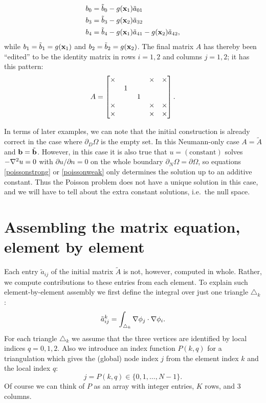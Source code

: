 \begin{example}
\begin{align*}
b_0 &= \tilde b_0 - g(\mathbf{x}_1) \tilde a_{01} \\
b_3 &= \tilde b_3 - g(\mathbf{x}_2) \tilde a_{32} \\
b_4 &= \tilde b_4 - g(\mathbf{x}_1) \tilde a_{41} - g(\mathbf{x}_2) \tilde a_{42},
\end{align*}
while $b_1=\tilde b_1=g(\mathbf{x}_1)$ and $b_2 = \tilde b_2 = g(\mathbf{x}_2)$.  The final matrix $A$ has thereby been ``edited'' to be the identity matrix in rows $i=1,2$ and columns $j=1,2$; it has this pattern:
\begin{equation*}
A = \begin{bmatrix}
\times & & & \times & \times \\
 & \,1\, & & & \\
 & & \,1\, & & \\
\times & & & \times & \times \\
\times & & & \times & \times
\end{bmatrix}.
\end{equation*}
\end{example}
\noindent\hrulefill

\bigskip

In terms of later examples, we can note that the initial construction is already correct in the case where $\partial_D \Omega$ is the empty set.  In this Neumann-only case $A=\tilde A$ and $\mathbf{b} = \tilde {\mathbf{b}}$.  However, in this case it is also true that $u=(\text{constant})$ solves $-\nabla^2 u=0$ with $\partial u/\partial n = 0$ on the whole boundary $\partial_N \Omega = \partial \Omega$, so equations \eqref{poissonstrong} or \eqref{poissonweak} only determines the solution up to an additive constant.  Thus the Poisson problem does not have a unique solution in this case, and we will have to tell \PETSc about the extra constant solutions, i.e.~the null space.


\section{Assembling the matrix equation, element by element}

Each entry $\tilde a_{ij}$ of the initial matrix $\tilde A$ is not, however, computed in whole.  Rather, we compute contributions to these entries from each element.  To explain such element-by-element assembly we first define the integral over just one triangle $\triangle_k$:
    $$\tilde a_{ij}^k = \int_{\triangle_k} \nabla \phi_j \cdot \nabla \phi_i.$$
For each triangle $\triangle_k$ we assume that the three vertices are identified by local indices $q=0,1,2$.  Also we introduce an index function $P(k,q)$ for a triangulation which gives the (global) node index $j$ from the element index $k$ and the local index $q$:
    $$j=P(k,q) \in \{0,1,\dots,N-1\}.$$
Of course we can think of $P$ as an array with integer entries, $K$ rows, and 3 columns.

